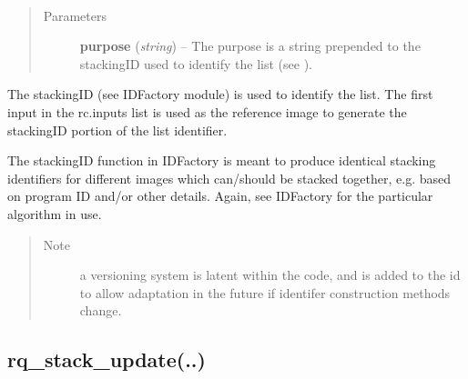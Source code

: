 \documentclass[letterpaper,10pt,english]{sphinxmanual}
\begin{document}
\begin{fulllineitems}
\label{chapter_ReductionContextClass:astrodata.RecipeManager.ReductionContext.rq_stack_get}~\begin{quote}\begin{description}
\item[{Parameters}] \leavevmode
\textbf{purpose} (\emph{string}) -- The purpose is a string prepended to the stackingID
used to identify the list (see ).

\end{description}\end{quote}

The stackingID (see IDFactory module) is used to identify the list.
The first input in the rc.inputs list is used as the reference image 
to generate  
the stackingID portion of the list identifier.

The stackingID function in IDFactory is meant to produce identical
stacking identifiers for different images which can/should be stacked 
together, e.g. based
on program ID and/or other details.  Again, see IDFactory for the
particular algorithm in use.
\begin{quote}\begin{description}
\item[{Note }] \leavevmode
a versioning system is latent within the code, and is added
to the id to allow adaptation in the future if identifer construction
methods change.

\end{description}\end{quote}

\end{fulllineitems}



\subsection{rq\_stack\_update(..)}
\label{chapter_ReductionContextClass:rq-stack-update}
\end{document}
